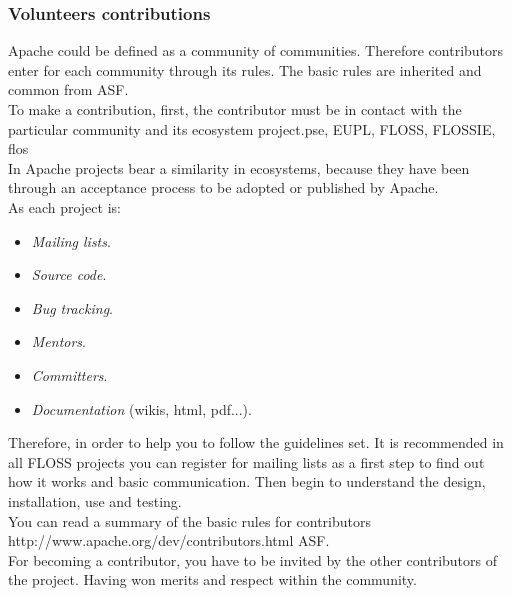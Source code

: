 \subsubsection{ Volunteers contributions} Apache could be defined as a community of communities. Therefore contributors enter for each community through its rules. The basic rules are inherited and common from ASF.
\\ To make a contribution, first, the contributor must be in contact with the particular community and its ecosystem project.pse, EUPL, FLOSS, FLOSSIE, flos
\\ In Apache projects bear a similarity in ecosystems, because they have been through an acceptance process to be adopted or published by Apache.
\\ As each project is:
\begin{itemize}
	\item \textit{Mailing lists}.
	\item \textit{Source code}.
	\item \textit{Bug tracking}.
	\item \textit{Mentors}.
	\item \textit{Committers}.
	\item \textit{Documentation} (wikis, html, pdf...).
\end{itemize} Therefore, in order to help you to follow the guidelines set. It is recommended in all FLOSS projects you can register for mailing lists as a first step to find out how it works and basic communication. Then begin to understand the design, installation, use and testing.
\\ You can read a summary of the basic rules for contributors http://www.apache.org/dev/contributors.html ASF.
\\ For becoming a contributor, you have to be invited by the other contributors of the project. Having won merits and respect within the community.

